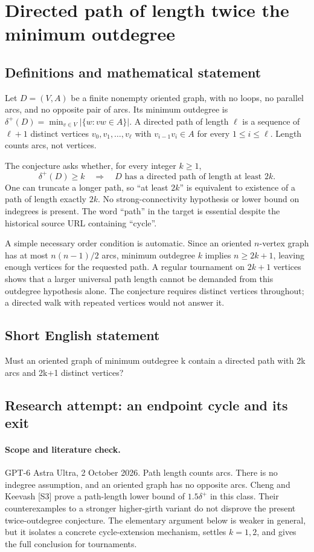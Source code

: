 \documentclass[11pt,a4paper]{article}
\begin{document}
\section*{Directed path of length twice the minimum outdegree}\label{statement}

\subsection{Definitions and mathematical statement}
Let $D=(V,A)$ be a finite nonempty oriented graph, with no loops, no
parallel arcs, and no opposite pair of arcs. Its minimum outdegree is
$\delta^+(D)=\min_{v\in V}|\{w:vw\in A\}|$. A directed path of length
$\ell$ is a sequence of $\ell+1$ distinct vertices
$v_0,v_1,\ldots,v_\ell$ with $v_{i-1}v_i\in A$ for every
$1\le i\le\ell$. Length counts arcs, not vertices.

The conjecture asks whether, for every integer $k\ge1$,
\[
       \delta^+(D)\ge k
       \quad\Longrightarrow\quad
       D\text{ has a directed path of length at least }2k.
\]
One can truncate a longer path, so ``at least $2k$'' is equivalent to
existence of a path of length exactly $2k$. No strong-connectivity
hypothesis or lower bound on indegrees is present. The word ``path''
in the target is essential despite the historical source URL containing
``cycle''.

A simple necessary order condition is automatic. Since an oriented
$n$-vertex graph has at most $n(n-1)/2$ arcs, minimum outdegree $k$
implies $n\ge2k+1$, leaving enough vertices for the requested path.
A regular tournament on $2k+1$ vertices shows that a larger universal
path length cannot be demanded from this outdegree hypothesis alone.
The conjecture requires distinct vertices throughout; a directed walk
with repeated vertices would not answer it.
\subsection{Short English statement}
Must an oriented graph of minimum outdegree k contain a directed path with 2k arcs and 2k+1 distinct vertices?
\subsection{Research attempt: an endpoint cycle and its exit}
\paragraph{Scope and literature check.}
GPT-6 Astra Ultra, 2 October 2026. Path length counts arcs. There is no
indegree assumption, and an oriented graph has no opposite arcs.
Cheng and Keevash [S3] prove a path-length lower bound of
$1.5\delta^+$ in this class. Their counterexamples to a stronger
higher-girth variant do not disprove the present twice-outdegree
conjecture. The elementary argument below is weaker in general,
but it isolates a concrete cycle-extension mechanism, settles
$k=1,2$, and gives the full conclusion for tournaments.
\end{document}
